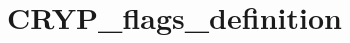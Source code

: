 \hypertarget{group___c_r_y_p__flags__definition}{\section{C\-R\-Y\-P\-\_\-flags\-\_\-definition}
\label{group___c_r_y_p__flags__definition}
}
